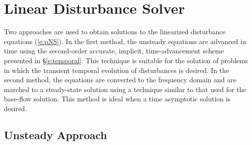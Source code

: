 \section{Linear Disturbance Solver \label{s:dist} }

Two approaches are used to obtain solutions to the linearized disturbance
equations (\ref{e:pNS}).  In the first method, the unsteady equations are
advanced in time using the second-order accurate, implicit, time-advancement
scheme presented in \S\ref{s:temporal}.  This technique is suitable for the
solution of problems in which the transient temporal evolution of disturbances
is desired.  In the second method, the equations are converted to the
frequency domain and are marched to a steady-state solution using a technique
similar to that used for the base-flow solution.  This method is ideal when a
time asymptotic solution is desired.

\subsection{Unsteady Approach \label{ss:unsteady} }

